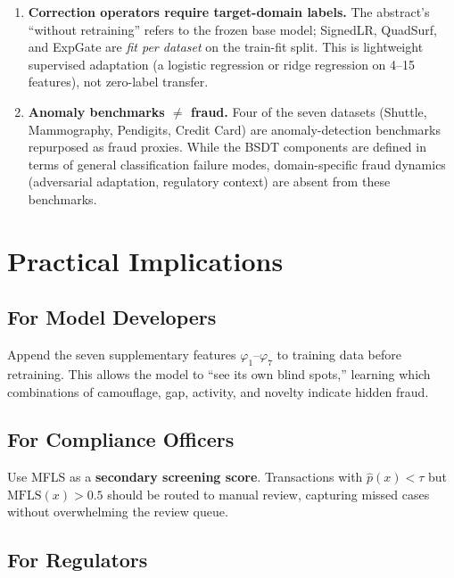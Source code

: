 \documentclass[journal]{IEEEtran}
\newcommand{\MFLS}{\mathrm{MFLS}}
\begin{document}
\begin{enumerate}
  \item \textbf{Correction operators require target-domain labels.} The abstract's ``without retraining'' refers to the frozen base model; SignedLR, QuadSurf, and ExpGate are \emph{fit per dataset} on the train-fit split. This is lightweight supervised adaptation (a logistic regression or ridge regression on 4--15 features), not zero-label transfer.

  \item \textbf{Anomaly benchmarks $\neq$ fraud.} Four of the seven datasets (Shuttle, Mammography, Pendigits, Credit Card) are anomaly-detection benchmarks repurposed as fraud proxies. While the BSDT components are defined in terms of general classification failure modes, domain-specific fraud dynamics (adversarial adaptation, regulatory context) are absent from these benchmarks.
\end{enumerate}

\section{Practical Implications}
\label{sec:implications}

\subsection{For Model Developers}

Append the seven supplementary features $\varphi_1$--$\varphi_7$ to training data before retraining. This allows the model to ``see its own blind spots,'' learning which combinations of camouflage, gap, activity, and novelty indicate hidden fraud.

\subsection{For Compliance Officers}

Use MFLS as a \textbf{secondary screening score}. Transactions with $\hat{p}(x) < \tau$ but $\MFLS(x) > 0.5$ should be routed to manual review, capturing missed cases without overwhelming the review queue.

\subsection{For Regulators}
\end{document}
